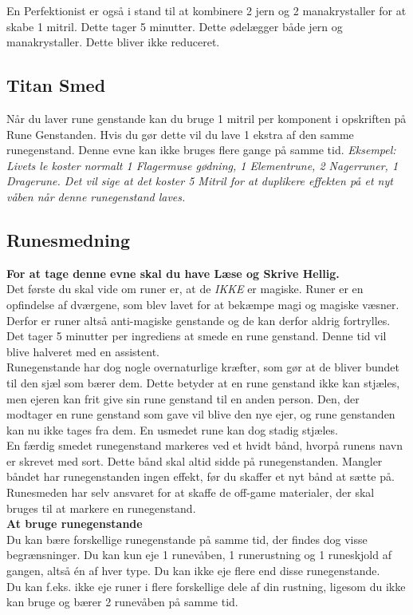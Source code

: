 En Perfektionist er også i stand til at kombinere 2 jern og 2 manakrystaller for at skabe 1 mitril. Dette tager 5 minutter. Dette ødelægger både jern og manakrystaller. Dette bliver ikke reduceret.

\subsection{Titan Smed}
Når du laver rune genstande kan du bruge 1 mitril per komponent i opskriften på Rune Genstanden. Hvis du gør dette vil du lave 1 ekstra af den samme runegenstand. Denne evne kan ikke bruges flere gange på samme tid.
\textit{Eksempel: Livets le koster normalt 1 Flagermuse gødning, 1 Elementrune, 2 Nagerruner, 1 Dragerune. Det vil sige at det koster 5 Mitril for at duplikere effekten på et nyt våben når denne runegenstand laves.}

\subsection{Runesmedning}
\textbf{For at tage denne evne skal du have Læse og Skrive Hellig.}\\
Det første du skal vide om runer er, at de \emph{IKKE} er magiske. Runer er en opfindelse af dværgene, som blev lavet for at bekæmpe magi og magiske væsner. Derfor er runer altså anti-magiske genstande og de kan derfor aldrig fortrylles.\\
Det tager 5 minutter per ingrediens at smede en rune genstand. Denne tid vil blive halveret med en assistent.\\
Runegenstande har dog nogle overnaturlige kræfter, som gør at de bliver bundet til den sjæl som bærer dem. Dette betyder at en rune genstand ikke kan stjæles, men ejeren kan frit give sin rune genstand til en anden person. Den, der modtager en rune genstand som gave vil blive den nye ejer, og rune genstanden kan nu ikke tages fra dem. En usmedet rune kan dog stadig stjæles.\\

En færdig smedet runegenstand markeres ved et hvidt bånd, hvorpå runens navn er skrevet med sort. Dette bånd skal altid sidde på runegenstanden. Mangler båndet har runegenstanden ingen effekt, før du skaffer et nyt bånd at sætte på. Runesmeden har selv ansvaret for at skaffe de off-game materialer, der skal bruges til at markere en runegenstand.\\

\textbf{At bruge runegenstande}\\
Du kan bære forskellige runegenstande på samme tid, der findes dog visse begrænsninger. Du kan kun eje 1 runevåben, 1 runerustning og 1 runeskjold af gangen, altså én af hver type. Du kan ikke eje flere end disse runegenstande.\\
Du kan f.eks. ikke eje runer i flere forskellige dele af din rustning, ligesom du ikke kan bruge og bærer 2 runevåben på samme tid.\\

